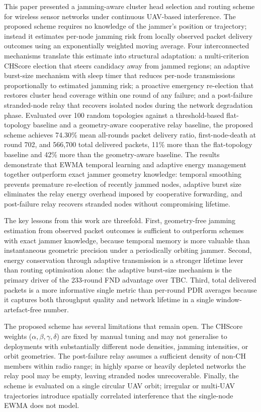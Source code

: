 \documentclass[conference]{IEEEtran}
\begin{document}
This paper presented a jamming-aware cluster head selection and routing
scheme for wireless sensor networks under continuous UAV-based
interference. The proposed scheme requires no knowledge of the jammer's
position or trajectory; instead it estimates per-node jamming risk from
locally observed packet delivery outcomes using an exponentially weighted
moving average. Four interconnected mechanisms translate this estimate
into structural adaptation: a multi-criterion CHScore election that
steers candidacy away from jammed regions; an adaptive burst-size
mechanism with sleep timer that reduces per-node transmissions
proportionally to estimated jamming risk; a proactive emergency
re-election that restores cluster head coverage within one round of any
failure; and a post-failure stranded-node relay that recovers isolated
nodes during the network degradation phase. Evaluated over 100 random
topologies against a threshold-based flat-topology baseline and a
geometry-aware cooperative relay baseline, the proposed scheme achieves
74.30\% mean all-rounds packet delivery ratio, first-node-death at round
702, and 566,700 total delivered packets, 11\% more than the
flat-topology baseline and 42\% more than the geometry-aware baseline.
The results demonstrate that
EWMA temporal learning and adaptive energy management together outperform
exact jammer geometry knowledge: temporal smoothing prevents premature
re-election of recently jammed nodes, adaptive burst size eliminates the
relay energy overhead imposed by cooperative forwarding, and post-failure
relay recovers stranded nodes without compromising lifetime.

The key lessons from this work are threefold. First, geometry-free
jamming estimation from observed packet outcomes is sufficient to
outperform schemes with exact jammer knowledge, because temporal memory
is more valuable than instantaneous geometric precision under a
periodically orbiting jammer. Second, energy conservation through
adaptive transmission is a stronger lifetime lever than routing
optimisation alone: the adaptive burst-size mechanism is the primary
driver of the 233-round FND advantage over TBC. Third, total delivered
packets is a more informative single metric than per-round PDR averages
because it captures both throughput quality and network lifetime in a
single window-artefact-free number.

The proposed scheme has several limitations that remain open. The CHScore
weights ($\alpha, \beta, \gamma, \delta$) are fixed by manual tuning and
may not generalise to deployments with substantially different node
densities, jamming intensities, or orbit geometries. The post-failure
relay assumes a sufficient density of non-CH members within radio range;
in highly sparse or heavily depleted networks the relay pool may be empty,
leaving stranded nodes unrecoverable. Finally, the scheme is evaluated on
a single circular UAV orbit; irregular or multi-UAV trajectories
introduce spatially correlated interference that the single-node EWMA
does not model.
\end{document}
